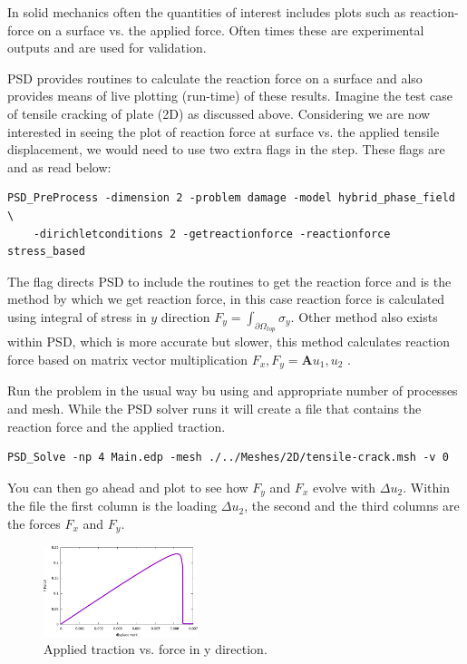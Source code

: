 In solid mechanics often the quantities of interest includes plots such as reaction-force on a surface vs. the applied force. Often times these are experimental outputs and are used for validation. 

PSD provides routines to calculate the reaction force on a surface and also provides means of live plotting (run-time)  of these results. Imagine the test case of tensile cracking of plate (2D) as discussed above. Considering we are now interested in seeing the plot of reaction force at surface vs. the applied tensile displacement, we would need to use two extra flags in the    step. These flags are  and  as read below:

\begin{lstlisting}[style=BashInputStyle]
	PSD_PreProcess -dimension 2 -problem damage -model hybrid_phase_field \
	-dirichletconditions 2 -getreactionforce -reactionforce stress_based
\end{lstlisting}

The flag   directs PSD to include the routines to get the reaction force and   is the method by which we get reaction force, in this case reaction force is calculated using integral of stress in $y$ direction $F_y=\int_{\partial\Omega_{top}} \sigma_y$. Other method  also exists within PSD, which is more accurate but slower, this method calculates reaction force based on matrix vector multiplication ${F_x,F_y}=\mathbf{A}{u_1,u_2}$ .

Run the problem in the usual way bu using  and appropriate number of processes and mesh.  While the PSD solver runs it will create a file  that contains the reaction force and the applied traction. 

\begin{lstlisting}[style=BashInputStyle]
	PSD_Solve -np 4 Main.edp -mesh ./../Meshes/2D/tensile-crack.msh -v 0
\end{lstlisting}

You can then go ahead and plot  to see how $F_y$ and $F_x$  evolve  with $\Delta u_2$. Within the file the first column is the loading $\Delta u_2$, the second and the third columns are the forces $F_x$ and $F_y$.



\begin{figure}[h!]
	\centering
	
	\includegraphics[width=0.4\textwidth]{./Images/plot-fd.png}
	\caption{Applied traction vs. force in y direction. \label{fd-plot}}
\end{figure}

